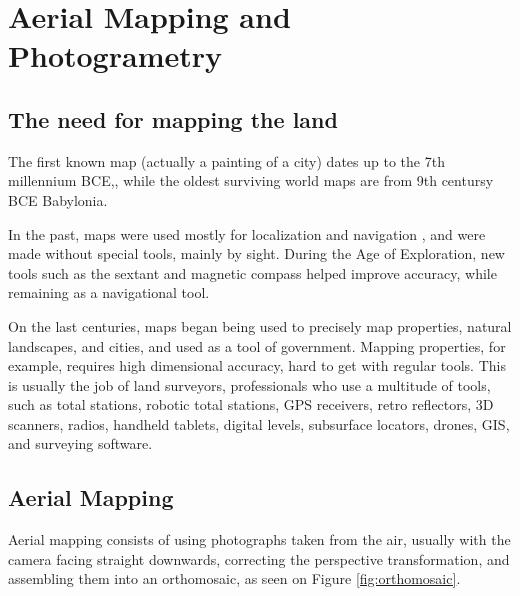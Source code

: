 

\chapter{Aerial Mapping and Photogrametry} \label{chap:AerialMapping}



\section{The need for mapping the land}
The first known map (actually a painting of a city) dates up to the 7th millennium BCE,\cite{map1}, while the oldest surviving world maps are from 9th centursy BCE Babylonia\cite{map2}.

In the past, maps were used mostly for localization and navigation %
, and were made without special tools, mainly by sight. During the Age of Exploration, new tools such as the sextant and magnetic compass helped improve accuracy, while remaining as a navigational tool.

On the last centuries, maps began being used to precisely map properties, natural landscapes, and cities, and used as a tool of government\cite{mapgovernment}. Mapping properties, for example, requires high dimensional accuracy, hard to get with regular tools. This is usually the job of land surveyors, professionals who use a multitude of tools, such as total stations, robotic total stations, GPS receivers, retro reflectors, 3D scanners, radios, handheld tablets, digital levels, subsurface locators, drones, GIS, and surveying software.


\section{Aerial Mapping}
Aerial mapping consists of using photographs taken from the air, usually with the camera facing straight downwards, correcting the perspective transformation, and assembling them into an orthomosaic, as seen on Figure \ref{fig:orthomosaic}.


